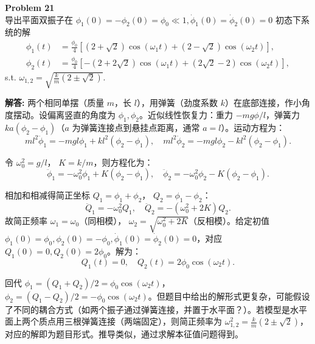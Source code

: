 \documentclass[12pt, a4paper, oneside]{ctexart}
\newenvironment{solution}{\par\noindent\textbf{解答:}\quad}{\par}
\begin{document}
\begin{mdframed}[backgroundcolor=gray!10, linewidth=0pt]
    \textbf{Problem 21} \\
    导出平面双振子在 \(\phi_1(0)=-\phi_2(0)=\phi_0\ll 1,\dot{\phi}_1(0)=\dot{\phi}_2(0)=0\) 初态下系统的解
    \[
    \begin{aligned}
        \phi_1(t) &= \frac{\phi_0}{4} \left[ (2+\sqrt{2})\cos(\omega_1 t) + (2-\sqrt{2})\cos(\omega_2 t) \right], \\
        \phi_2(t) &= \frac{\phi_0}{4} \left[ -(2+2\sqrt{2})\cos(\omega_1 t) + (2\sqrt{2}-2)\cos(\omega_2 t) \right],
    \end{aligned}
    \]
    s.t. \(\omega_{1,2} = \sqrt{\frac{k}{m}(2 \pm \sqrt{2})}\).
\end{mdframed}
\begin{solution}
    两个相同单摆（质量 \(m\)，长 \(l\)），用弹簧（劲度系数 \(k\)）在底部连接，作小角度摆动。设偏离竖直的角度为 \(\phi_1, \phi_2\)。近似线性恢复力：重力 \(-mg\phi/l\)，弹簧力 \(k a (\phi_2 - \phi_1)\)（\(a\) 为弹簧连接点到悬挂点距离，通常 \(a=l\)）。运动方程为：
    \[
    m l^2 \ddot{\phi}_1 = -m g l \phi_1 + k l^2 (\phi_2 - \phi_1), \quad m l^2 \ddot{\phi}_2 = -m g l \phi_2 - k l^2 (\phi_2 - \phi_1).
    \]
    
    令 \(\omega_0^2 = g/l\)， \(K = k/m\)，则方程化为：
    \[
    \ddot{\phi}_1 = -\omega_0^2 \phi_1 + K (\phi_2 - \phi_1), \quad \ddot{\phi}_2 = -\omega_0^2 \phi_2 - K (\phi_2 - \phi_1).
    \]
    
    相加和相减得简正坐标 \(Q_1 = \phi_1 + \phi_2\)， \(Q_2 = \phi_1 - \phi_2\)：
    \[
    \ddot{Q}_1 = -\omega_0^2 Q_1, \quad \ddot{Q}_2 = -(\omega_0^2 + 2K) Q_2.
    \]
    故简正频率 \(\omega_1 = \omega_0\)（同相模）， \(\omega_2 = \sqrt{\omega_0^2 + 2K}\)（反相模）。给定初值 \(\phi_1(0)=\phi_0, \phi_2(0)=-\phi_0, \dot{\phi}_1(0)=\dot{\phi}_2(0)=0\)，对应 \(Q_1(0)=0, Q_2(0)=2\phi_0\)。解为：
    \[
    Q_1(t)=0, \quad Q_2(t)=2\phi_0 \cos(\omega_2 t).
    \]
    
    回代 \(\phi_1 = (Q_1+Q_2)/2 = \phi_0 \cos(\omega_2 t)\)， \(\phi_2 = (Q_1-Q_2)/2 = -\phi_0 \cos(\omega_2 t)\)。但题目中给出的解形式更复杂，可能假设了不同的耦合方式（如两个振子通过弹簧连接，并置于水平面？）。若模型是水平面上两个质点用三根弹簧连接（两端固定），则简正频率为 \(\omega_{1,2}^2 = \frac{k}{m}(2 \pm \sqrt{2})\)，对应的解即为题目形式。推导类似，通过求解本征值问题得到。
\end{solution}
\end{document}
